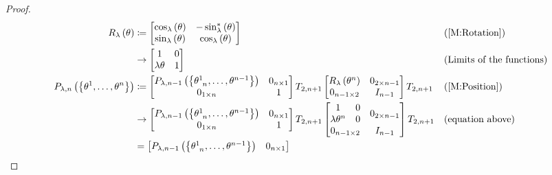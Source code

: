 \documentclass[../main.tex]{subfiles}
\begin{document}
\begin{proof}
\begin{align*}
R_\lambda\left(\theta\right)
&\coloneqq\begin{bmatrix}
\cos_\lambda\left(\theta\right)&-\sin_\lambda^\ast\left(\theta\right)\\
\sin_\lambda\left(\theta\right)&\cos_\lambda\left(\theta\right)\\
\end{bmatrix}&&\text{(\cref{M:Rotation})}\\
&\to\begin{bmatrix}
1&0\\
\lambda\theta&1\\
\end{bmatrix}&&\text{(Limits of the functions)}\\
P_{\lambda,n}\left(\left\{\tensor{\theta}{^1},\dots,\tensor{\theta}{^n}\right\}\right)
&\coloneqq
\begin{bmatrix}
P_{\lambda,n-1}\left(\left\{\tensor{\theta}{^1_{n}},\dots,\tensor{\theta}{^{n-1}}\right\}\right)&0_{n\times 1}\\
0_{1\times n}&1\\
\end{bmatrix}
T_{2,n+1}
\begin{bmatrix}
R_\lambda\left(\tensor{\theta}{^n}\right)&0_{{2}\times{n-1}}\\
0_{{n-1}\times{2}}&{I}_{n-1}\\
\end{bmatrix}
T_{2,n+1}&&\text{(\cref{M:Position})}\\
&\to
\begin{bmatrix}
P_{\lambda,n-1}\left(\left\{\tensor{\theta}{^1_{n}},\dots,\tensor{\theta}{^{n-1}}\right\}\right)&0_{n\times 1}\\
0_{1\times n}&1\\
\end{bmatrix}
T_{2,n+1}
\begin{bmatrix}
\begin{matrix*}1&0\\
\lambda\tensor{\theta}{^n}&0\\
\end{matrix*}&0_{{2}\times{n-1}}\\
0_{{n-1}\times{2}}&{I}_{n-1}\\
\end{bmatrix}
T_{2,n+1}&&\text{(equation above)}\\
&=
\begin{bmatrix}
P_{\lambda,n-1}\left(\left\{\tensor{\theta}{^1_{n}},\dots,\tensor{\theta}{^{n-1}}\right\}\right)&0_{n\times 1}\\

\end{bmatrix}
\end{align*}
\end{proof}
\end{document}
